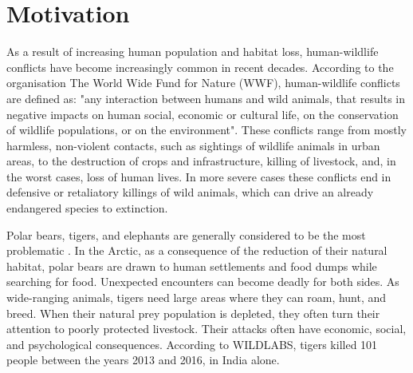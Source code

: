 \section{ Motivation}

As a result of increasing human population and habitat loss, human-wildlife conflicts have become increasingly common in recent decades\cite{philip-wildlife}.
According to the organisation The World Wide Fund for Nature (WWF), human-wildlife conflicts are defined as: "any interaction between humans and wild animals, that results in negative impacts on human social, economic or cultural life, on the conservation of wildlife populations, or on the environment"\cite{conflict-manual}.
These conflicts range from mostly harmless, non-violent contacts, such as sightings of wildlife animals in urban areas, to the destruction of crops and infrastructure, killing of livestock, and, in the worst cases, loss of human lives.
In more severe cases these conflicts end in defensive or retaliatory killings of wild animals, which can drive an already endangered species to extinction.

Polar bears, tigers, and elephants are generally considered to be the most problematic \cite{philip-wildlife}.
In the Arctic, as a consequence of the reduction of their natural habitat, polar bears are drawn to human settlements and food dumps while searching for food\cite{wildlabs-polarbears}.
Unexpected encounters can become deadly for both sides.
As wide-ranging animals, tigers need large areas where they can roam, hunt, and breed\cite{wildlabs-tigers}.
When their natural prey population is depleted, they often turn their attention to poorly protected livestock. 
Their attacks often have economic, social, and psychological consequences.
According to WILDLABS, tigers killed 101 people between the years 2013 and 2016, in India alone\cite{wildlabs-tigers}.

